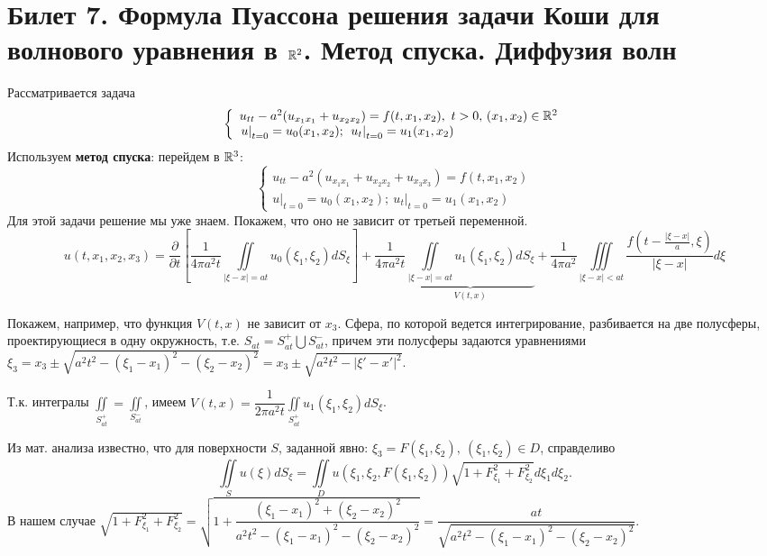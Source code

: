 \section{Билет 7. Формула Пуассона решения задачи Коши для волнового уравнения в $\mathbb{R}^2$. Метод спуска. Диффузия волн}
Рассматривается задача
\begin{equation}
\label{eq::7::cauchy}
\left\{
  \begin{array}{ll}
  u_{tt}-a^2(u_{x_1x_1}+u_{x_2x_2})=f(t,x_1,x_2),\ t>0,\, (x_1, x_2)\in \mathbb{R}^2\\
  \left. u\right|_{t=0}=u_0(x_1, x_2);\ \left. u_t\right|_{t=0}=u_1(x_1, x_2)
  \end{array}
\right.
\end{equation}
Используем \textbf{метод спуска}: перейдем в $\mathbb{R}^3$:
\begin{equation*}
\left\{
  \begin{array}{ll}
  u_{tt}-a^2(u_{x_1x_1}+u_{x_2x_2}+u_{x_3x_3})=f(t,x_1,x_2)\\
  \left. u\right|_{t=0}=u_0(x_1, x_2);\ \left. u_t\right|_{t=0}=u_1(x_1, x_2)
  \end{array}
\right.
\end{equation*}
Для этой задачи решение мы уже знаем. Покажем, что оно не зависит от третьей переменной.
\[
u(t, x_1, x_2, x_3)=\frac{\partial}{\partial t}\left[\frac{1}{4\pi a^2t}\iint\limits_{|\xi - x|=at}u_0(\xi_1, \xi_2)dS_{\xi} \right]+\frac{1}{4\pi a^2t}\underbrace{\iint\limits_{|\xi - x|=at}u_1(\xi_1, \xi_2)dS_{\xi}}_{V(t,x)}+\frac{1}{4\pi a^2}\iiint\limits_{|\xi - x|<at}\frac{f\left(t-\frac{|\xi - x|}{a}, \xi \right)}{|\xi - x|}d\xi
\]

Покажем, например, что функция $V(t,x)$ не зависит от $x_3$.
Сфера, по которой ведется интегрирование, разбивается на две полусферы, проектирующиеся в одну окружность, т.е. $S_{at}=S_{at}^+\bigcup S_{at}^-$, причем эти полусферы задаются уравнениями $\xi_3=x_3\pm \sqrt{a^2t^2-(\xi_1 -x_1)^2-(\xi_2 -x_2)^2}=x_3\pm \sqrt{a^2t^2-|\xi '-x'|^2}$.

Т.к. интегралы $\displaystyle\iint\limits_{S_{at}^+}=\iint\limits_{S_{at}^-}$, имеем $V(t,x)=\dfrac{1}{2\pi a^2t}\displaystyle\iint\limits_{S_{at}^+}u_1(\xi_1, \xi_2)dS_{\xi}$.

Из мат. анализа известно, что для поверхности $S$, заданной явно: $\xi_3=F(\xi_1, \xi_2),\ (\xi_1, \xi_2)\in D$, справделиво 
\[
\iint\limits_S u(\xi )dS_{\xi}=\iint\limits_D u\left( \xi_1, \xi_2, F(\xi_1, \xi_2)\right)\sqrt{1+F_{\xi_1}^2+F_{\xi_2}^2}d\xi_1d\xi_2.
\]
В нашем случае $\sqrt{1+F_{\xi_1}^2+F_{\xi_2}^2}=\sqrt{1+\dfrac{(\xi_1 - x_1)^2+(\xi_2 - x_2)^2}{a^2t^2 - (\xi_1 - x_1)^2-(\xi_2 - x_2)^2}}=\dfrac{at}{\sqrt{a^2t^2 - (\xi_1 - x_1)^2-(\xi_2 - x_2)^2}}$.


